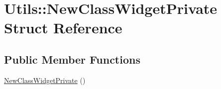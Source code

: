 \hypertarget{struct_utils_1_1_new_class_widget_private}{\section{\-Utils\-:\-:\-New\-Class\-Widget\-Private \-Struct \-Reference}
\label{struct_utils_1_1_new_class_widget_private}
}
\subsection*{\-Public \-Member \-Functions}
\begin{DoxyCompactItemize}
\item 
\hyperlink{struct_utils_1_1_new_class_widget_private_aca63a023b3ec69de089f4cb5a3b60e0f}{\-New\-Class\-Widget\-Private} ()
\end{DoxyCompactItemize}
